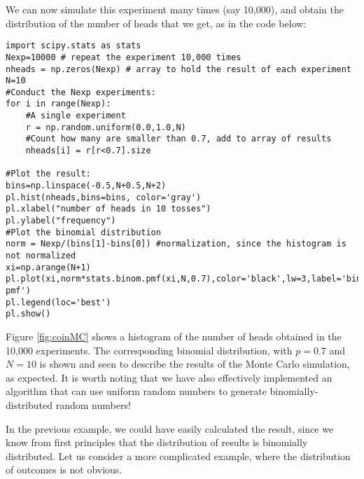 We can now simulate this experiment many times (say 10,000), and obtain the distribution of the number of heads that we get, as in the code below:
\begin{lstlisting}[frame=single] 
import scipy.stats as stats
Nexp=10000 # repeat the experiment 10,000 times
nheads = np.zeros(Nexp) # array to hold the result of each experiment
N=10
#Conduct the Nexp experiments:
for i in range(Nexp):
    #A single experiment
    r = np.random.uniform(0.0,1.0,N)
    #Count how many are smaller than 0.7, add to array of results
    nheads[i] = r[r<0.7].size    
    
#Plot the result:
bins=np.linspace(-0.5,N+0.5,N+2)
pl.hist(nheads,bins=bins, color='gray')
pl.xlabel("number of heads in 10 tosses")
pl.ylabel("frequency")
#Plot the binomial distribution
norm = Nexp/(bins[1]-bins[0]) #normalization, since the histogram is not normalized
xi=np.arange(N+1)
pl.plot(xi,norm*stats.binom.pmf(xi,N,0.7),color='black',lw=3,label='binomial pmf')
pl.legend(loc='best')
pl.show()
\end{lstlisting}
Figure \ref{fig:coinMC} shows a histogram of the number of heads obtained in the 10,000 experiments. The corresponding binomial distribution, with $p=0.7$ and $N=10$ is shown and seen to describe the results of the Monte Carlo simulation, as expected. It is worth noting that we have also effectively implemented an algorithm that can use uniform random numbers to generate binomially-distributed random numbers!


In the previous example, we could have easily calculated the result, since we know from first principles that the distribution of results is binomially distributed. Let us consider a more complicated example, where the distribution of outcomes is not obvious.

